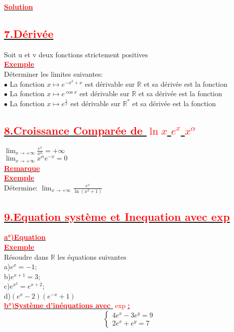 \documentclass[12pt,a4paper]{article}
\begin{document}
\underline{\textbf{\textcolor{red}{Solution}}}\\
\subsection*{\underline{\textbf{\textcolor{red}{7.Dérivée}}}}
Soit u et v deux fonctions strictement positives \\

\underline{\textbf{\textcolor{red}{Exemple}}}\\
Déterminer les limites suivantes:\\
$\bullet$ La fonction $x \longmapsto e^{-x^{2}+x}$ est dérivable sur $\mathbb{R}$ et sa dérivée est la fonction\\
$\bullet$ La fonction $x \longmapsto e^{\cos x}$ est dérivable sur $\mathbb{R}$ et sa dérivée est  la fonction\\
$\bullet$ La fonction $x \longmapsto e^{\frac{1}{x}}$ est dérivable sur $\mathbb{R}^{*}$ et sa dérivée est  la fonction\\
\subsection*{\underline{\textbf{\textcolor{red}{8.Croissance Comparée de $\ln x$ $e^{x}$ $x^{\alpha}$}}}}
$\lim_{x \to +\infty}\frac{e^{x}}{x^{\alpha}}=+\infty$\\
$\lim_{x \to +\infty}x^{\alpha}e^{-x}=0$\\
\underline{\textbf{\textcolor{red}{Remarque}}}\\
\underline{\textbf{\textcolor{red}{Exemple}}}\\
Détermine: $\lim_{x \to +\infty}\frac{e^{x}}{\ln(x^{2}+1)}$
\subsection*{\underline{\textbf{\textcolor{red}{9.Equation système et Inequation avec exp}}}}
\underline{\textbf{\textcolor{red}{a°)Equation}}}\\
\underline{\textbf{\textcolor{red}{Exemple}}}\\
Résoudre dans $\mathbb{R}$ les équations suivantes\\
a)$e^{x}=-1$;\\  b)$e^{x+1}=3$;\\ c)$e^{x^{2}}=e^{x+2}$;\\ d)$(e^{x}-2)(e^{-x}+1)$\\
\underline{\textbf{\textcolor{red}{b°)Système d'inéquations avec $\exp$:}}}\\
\[
\begin{cases}
4e^{x}-3e^{y} = 9 \\
2e^{x}+e^{y} = 7
\end{cases}
\]
\end{document}

